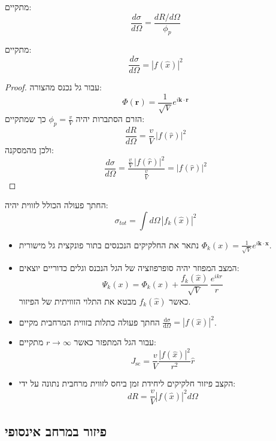 \documentclass{tstextbook}
\begin{document}
\begin{corollary}
מתקיים:
$$\frac{d\sigma}{d\Omega}=\frac{d R/d\Omega}{\phi_{p}}$$

\end{corollary}
\begin{proposition}
מתקיים:
$$\frac{d\sigma}{d\Omega}=|f(\hat{x})|^{2}$$

\end{proposition}
\begin{proof}
עבור גל נכנס מהצורה:
$$\Phi(\mathbf{r})={\frac{1}{\sqrt{V}}}e^{i\mathbf{k}\cdot\mathbf{r}}$$
הזרם הסתברות יהיה \(\phi_{p}=\frac{v}{V}\) כך שמתקיים:
$$\frac{d R}{d\Omega}=\frac{v}{V}\,|f(\hat{r})|^{2}$$
ולכן מהמסקנה:
$$\frac{d\sigma}{d\Omega}=\frac{\frac{v}{V}\,|f(\hat{r})|^{2}}{\frac{v}{V}}=|f(\hat{r})|^{2}$$

\end{proof}
\begin{corollary}
החתך פעולה הכולל לזווית יהיה:
$$\sigma_{t o t}=\int d\Omega\,|f_{k}(\hat{x})|^{2}$$

\end{corollary}
\begin{summary}
  \begin{itemize}
    \item נתאר את החלקיקים הנכנסים בתור פונקצית גל מישורית \(\Phi_{k}(x)=\frac{1}{\sqrt{ V }}e^{ i\mathbf{k}\cdot \mathbf{x} }\).
    \item המצב המפוזר יהיה סופרפוזציה של הגל הנכנס וגלים כדוריים יוצאים:
$$\Psi_{k}(x)=\Phi_{k}(x)+\frac{f_{k}(\hat{x})}{\sqrt{V}}\,\frac{e^{i k r}}{r}$$
כאשר \(f_{k}\left( \hat{x} \right)\) מבטא את התלוי הזוויתית של הפיזור.
    \item החתך פעולה כתלות בזווית המרחבית מקיים \(\frac{\mathrm{d} \sigma}{\mathrm{d} \Omega}=\left\lvert  f\left( \hat{x} \right)  \right\rvert^{2}\).
    \item עבור הגל המתפזר כאשר \(r\to \infty\) מתקיים:
$$J_{\mathrm{sc}}={\frac{v}{V}}{\frac{|f({\hat{x}})|^{2}}{r^{2}}}{\hat{r}}$$
    \item הקצב פיזור חלקיקים ליחידת זמן ביחס לזווית מרחבית נתונה על ידי:
$$d R=\frac{v}{V}|f(\hat{x})|^{2}d\Omega$$
  \end{itemize}
\end{summary}
\subsection{פיזור במרחב אינסופי}
\end{document}
